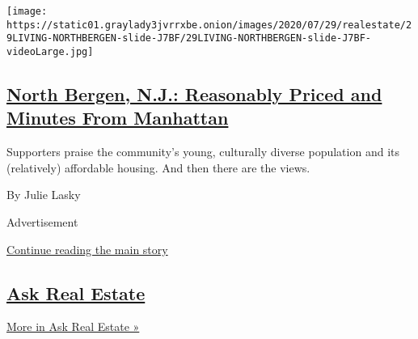\begin{enumerate}
  \texttt{[image: https://static01.graylady3jvrrxbe.onion/images/2020/07/29/realestate/29LIVING-NORTHBERGEN-slide-J7BF/29LIVING-NORTHBERGEN-slide-J7BF-videoLarge.jpg]}

  \hypertarget{north-bergen-nj-reasonably-priced-and-minutes-from-manhattan}{%
  \subsection{\texorpdfstring{\href{/2020/07/29/realestate/north-bergen-nj-reasonably-priced-and-minutes-from-manhattan.html}{North
  Bergen, N.J.: Reasonably Priced and Minutes From
  Manhattan}}{North Bergen, N.J.: Reasonably Priced and Minutes From Manhattan}}\label{north-bergen-nj-reasonably-priced-and-minutes-from-manhattan}}

  Supporters praise the community's young, culturally diverse population
  and its (relatively) affordable housing. And then there are the views.

  By Julie Lasky
\end{enumerate}

Advertisement

\protect\hyperlink{after-mid1}{Continue reading the main story}

\hypertarget{ask-real-estate-1}{%
\subsection{\texorpdfstring{\href{/column/ask-real-estate}{Ask Real
Estate}}{Ask Real Estate}}\label{ask-real-estate-1}}

\href{/column/ask-real-estate}{More in Ask Real Estate »}

